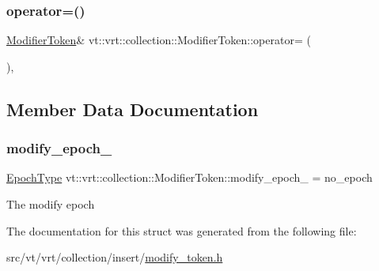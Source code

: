\mbox{\label{structvt_1_1vrt_1_1collection_1_1_modifier_token_a781c57243819fb3bd6f37b60f97faf0a}} 
\subsubsection{\texorpdfstring{operator=()}{operator=()}\hspace{0.1cm}{\footnotesize\ttfamily [2/2]}}
{\footnotesize\ttfamily \hyperlink{structvt_1_1vrt_1_1collection_1_1_modifier_token}{Modifier\+Token}\& vt\+::vrt\+::collection\+::\+Modifier\+Token\+::operator= (\begin{DoxyParamCaption}\item[{\hyperlink{structvt_1_1vrt_1_1collection_1_1_modifier_token}{Modifier\+Token} \&\&}]{ }\end{DoxyParamCaption})\hspace{0.3cm}{\ttfamily [default]}, {\ttfamily [noexcept]}}



\subsection{Member Data Documentation}
\mbox{\label{structvt_1_1vrt_1_1collection_1_1_modifier_token_a3c0115cdf4a5097aa9ff940b0e8c9172}} 
\subsubsection{\texorpdfstring{modify\+\_\+epoch\+\_\+}{modify\_epoch\_}}
{\footnotesize\ttfamily \hyperlink{namespacevt_a985a5adf291c34a3ca263b3378388236}{Epoch\+Type} vt\+::vrt\+::collection\+::\+Modifier\+Token\+::modify\+\_\+epoch\+\_\+ = no\+\_\+epoch\hspace{0.3cm}{\ttfamily [private]}}

The modify epoch 

The documentation for this struct was generated from the following file\+:\begin{DoxyCompactItemize}
\item 
src/vt/vrt/collection/insert/\hyperlink{modify__token_8h}{modify\+\_\+token.\+h}\end{DoxyCompactItemize}
